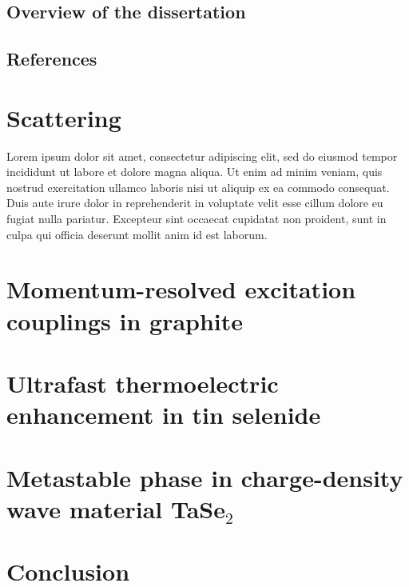 \documentclass[
  11pt,
  canadian,
  a4paper,
  open=right,
  twoside=true,
  cleardoublepage=empty,
  clearpage=empty]{scrbook}
\begin{document}
\hypertarget{sec:overview}{%
\section{Overview of the dissertation}\label{sec:overview}}

\hypertarget{references}{%
\section*{References}\label{references}}




\hypertarget{scattering}{%
\chapter{Scattering}\label{scattering}}

Lorem ipsum dolor sit amet, consectetur adipiscing elit, sed do eiusmod tempor incididunt ut labore et dolore magna aliqua. Ut enim ad minim veniam, quis nostrud exercitation ullamco laboris nisi ut aliquip ex ea commodo consequat. Duis aute irure dolor in reprehenderit in voluptate velit esse cillum dolore eu fugiat nulla pariatur. Excepteur sint occaecat cupidatat non proident, sunt in culpa qui officia deserunt mollit anim id est laborum.

\hypertarget{sec:graphite}{%
\chapter{Momentum-resolved excitation couplings in graphite}\label{sec:graphite}}

\hypertarget{sec:snse}{%
\chapter{Ultrafast thermoelectric enhancement in tin selenide}\label{sec:snse}}

\hypertarget{metastable-phase-in-charge-density-wave-material-tase_2}{%
\chapter{\texorpdfstring{Metastable phase in charge-density wave material TaSe\(_2\)}{Metastable phase in charge-density wave material TaSe\_2}}\label{metastable-phase-in-charge-density-wave-material-tase_2}}

\hypertarget{sec:conclusion}{%
\chapter{Conclusion}\label{sec:conclusion}}
\end{document}
